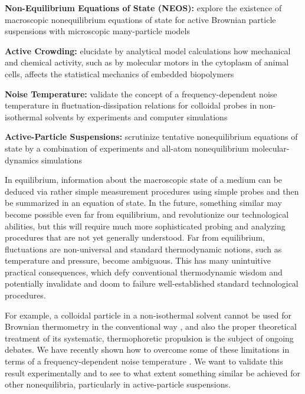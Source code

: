 \begin{workpackage}[id=WPactive,wphases=0-48,
  short=Active Particle Suspensions,%
  title=Probing Active Particle Suspensions with Colloids and Polymers,
  lead=ULEI,
  ULEIRM=96,UNIPDRM=6,USTUTTRM=2]

\newrefsection

\begin{wpobjectives}
  \begin{compactitem}
  \item \textbf{Non-Equilibrium Equations of State (NEOS):} explore the existence of
  macroscopic nonequilibrium equations of state for active Brownian particle suspensions
  with microscopic many-particle models
  \item \textbf{Active Crowding:} elucidate by analytical model calculations how mechanical
  and chemical activity, such as by molecular motors in the cytoplasm of animal cells,
  affects the statistical mechanics of embedded biopolymers
  \item \textbf{Noise Temperature:} validate the concept of a frequency-dependent noise
  temperature in fluctuation-dissipation relations for colloidal probes 
  in non-isothermal solvents by experiments and computer simulations
  \item \textbf{Active-Particle Suspensions:} scrutinize tentative nonequilibrium equations
  of state by a combination of experiments and all-atom nonequilibrium molecular-dynamics
  simulations
  \end{compactitem}
\end{wpobjectives}

\begin{wpdescription}
In equilibrium, information about the macroscopic state of a medium can be deduced via
rather simple measurement procedures using simple probes and then be summarized in an
equation of state.
%
In the future, something similar may become possible even far from equilibrium, and
revolutionize our technological abilities, but this will require much more sophisticated
probing and analyzing procedures that are not yet generally understood.
%
Far from equilibrium, fluctuations are non-universal and standard thermodynamic notions,
such as temperature and pressure, become ambiguous.
%
This has many unintuitive practical consequences, which defy conventional thermodynamic
wisdom and potentially invalidate and doom to failure well-established standard
technological procedures.

For example, a colloidal particle in a non-isothermal solvent cannot be used for Brownian thermometry 
in the conventional way \cite{rings-etal:2010,kroy:2014}, and also the proper theoretical 
treatment of its systematic, thermophoretic propulsion is the subject of ongoing debates.
%
We have recently shown how to overcome some of these limitations in terms of a frequency-dependent noise 
temperature \cite{falasco-etal:2014}.
%
We want to validate this result experimentally and to see to what extent something similar be achieved for other 
nonequilibria, particularly in active-particle suspensions.


\end{wpdescription}
\end{workpackage}
